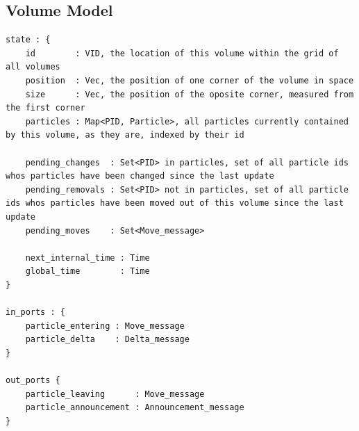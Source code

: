 \documentclass[conference]{IEEEtran}
\begin{document}
\subsection{Volume Model}
\begin{lstlisting}
state : {
	id        : VID, the location of this volume within the grid of all volumes
	position  : Vec, the position of one corner of the volume in space
	size      : Vec, the position of the oposite corner, measured from the first corner 
	particles : Map<PID, Particle>, all particles currently contained by this volume, as they are, indexed by their id
	
	pending_changes  : Set<PID> in particles, set of all particle ids whos particles have been changed since the last update
	pending_removals : Set<PID> not in particles, set of all particle ids whos particles have been moved out of this volume since the last update
	pending_moves    : Set<Move_message>
	
	next_internal_time : Time
	global_time        : Time
}

in_ports : {
	particle_entering : Move_message
	particle_delta    : Delta_message
}

out_ports {
	particle_leaving      : Move_message
	particle_announcement : Announcement_message
}
\end{lstlisting}
\end{document}

